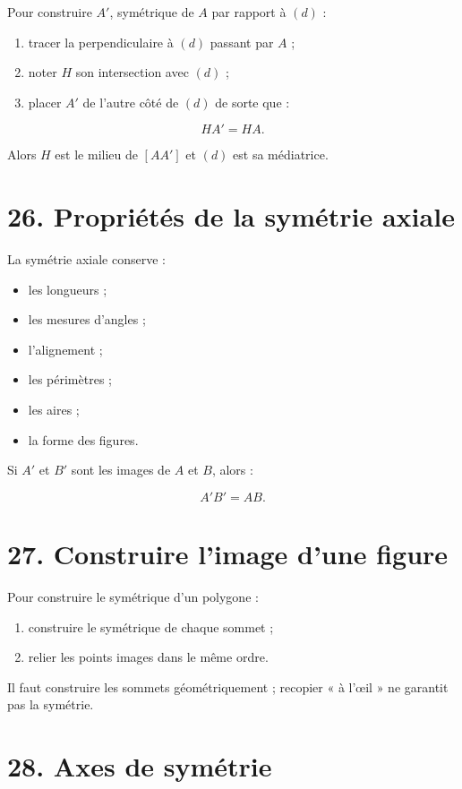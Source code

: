 Pour construire $A'$, symétrique de $A$ par rapport à $(d)$ :

\begin{enumerate}
\item tracer la perpendiculaire à $(d)$ passant par $A$ ;
\item noter $H$ son intersection avec $(d)$ ;
\item placer $A'$ de l’autre côté de $(d)$ de sorte que :
\end{enumerate}

\[
HA'=HA.
\]

Alors $H$ est le milieu de $[AA']$ et $(d)$ est sa médiatrice.

\section{26. Propriétés de la symétrie axiale}

La symétrie axiale conserve :

\begin{itemize}
\item les longueurs ;
\item les mesures d’angles ;
\item l’alignement ;
\item les périmètres ;
\item les aires ;
\item la forme des figures.
\end{itemize}

Si $A'$ et $B'$ sont les images de $A$ et $B$, alors :

\[
A'B'=AB.
\]

\section{27. Construire l’image d’une figure}

Pour construire le symétrique d’un polygone :

\begin{enumerate}
\item construire le symétrique de chaque sommet ;
\item relier les points images dans le même ordre.
\end{enumerate}

Il faut construire les sommets géométriquement ; recopier « à l’œil » ne garantit pas la symétrie.

\section{28. Axes de symétrie}

